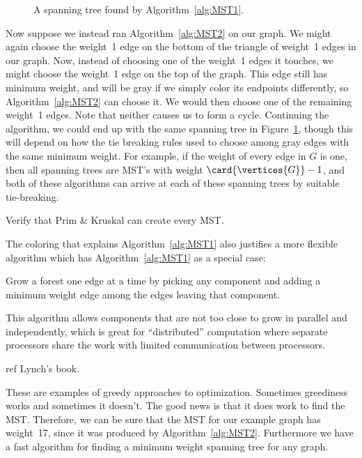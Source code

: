 \begin{figure}


\caption{A spanning tree found by Algorithm~\ref{alg:MST1}.}

\label{fig:5KC}

\end{figure}

Now suppose we instead ran Algorithm~\ref{alg:MST2} on our graph.  We
might again choose the weight~1 edge on the bottom of the triangle of
weight~1 edges in our graph.  Now, instead of choosing one of the
weight~1 edges it touches, we might choose the weight~1 edge on the
top of the graph.  This edge still has minimum weight, and will be
gray if we simply color its endpoints differently, so
Algorithm~\ref{alg:MST2} can choose it.  We would then choose one of
the remaining weight~1 edges.  Note that neither causes us to form a
cycle.  Continuing the algorithm, we could end up with the same
spanning tree in Figure~\ref{fig:5KC}, though this will depend on how
the tie breaking rules used to choose among gray edges with the same
minimum weight.  For example, if the weight of every edge in $G$ is
one, then all spanning trees are MST's with weight
$\card{\vertices{G}}-1$, and both of these algorithms can arrive at
each of these spanning trees by suitable tie-breaking.

\begin{editingnotes}
Verify that Prim \& Kruskal can create every MST.
\end{editingnotes}

The coloring that explains Algorithm~\ref{alg:MST1} also justifies a more
flexible algorithm which has Algorithm~\ref{alg:MST1} as a special case:
\begin{algorithm}\label{alg:MST3}
  Grow a forest one edge at a time by picking any component and adding a
  minimum weight edge among the edges leaving that component.
\end{algorithm}
This algorithm allows components that are not too close to grow in
parallel and independently, which is great for ``distributed'' computation
where separate processors share the work with limited communication
between processors.

\begin{editingnotes}
ref Lynch's book.
\end{editingnotes}

These are examples of greedy approaches to optimization.  Sometimes
greediness works and sometimes it doesn't.  The good news is that it
does work to find the MST.  Therefore, we can be sure that the MST for
our example graph has weight~17, since it was produced by
Algorithm~\ref{alg:MST2}.  Furthermore we have a fast algorithm for
finding a minimum weight spanning tree for any graph.

